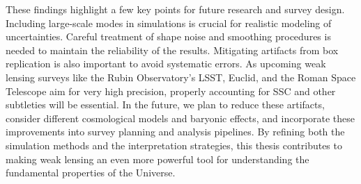 These findings highlight a few key points for future research and survey design. Including large-scale modes in simulations is crucial for realistic modeling of uncertainties. Careful treatment of shape noise and smoothing procedures is needed to maintain the reliability of the results. Mitigating artifacts from box replication is also important to avoid systematic errors. As upcoming weak lensing surveys like the Rubin Observatory's LSST, Euclid, and the Roman Space Telescope aim for very high precision, properly accounting for SSC and other subtleties will be essential. In the future, we plan to reduce these artifacts, consider different cosmological models and baryonic effects, and incorporate these improvements into survey planning and analysis pipelines. By refining both the simulation methods and the interpretation strategies, this thesis contributes to making weak lensing an even more powerful tool for understanding the fundamental properties of the Universe.
